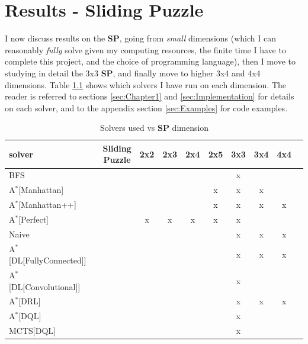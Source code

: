 \chapter{Results - Sliding Puzzle} %

\label{sec:ResultsSP} %


I now discuss results on the \textbf{SP}, going from \textit{small} dimensions (which I can reasonably \textit{fully} solve given my computing resources, the finite time I have to complete this project, and the choice of programming language), then I move to studying in detail the 3x3 \textbf{SP}, and finally move to higher 3x4 and 4x4 dimensions. Table \ref{tab:gridSP} shows which solvers I have run on each dimension. The reader is referred to sections \ref{sec:Chapter1} and \ref{sec:Implementation} for details on each solver, and to the appendix section \ref{sec:Examples} for code examples.

\begin{table}[H]
\begin{center}
\begin{tabular}{l*{9}{c}r}
\hline
\textbf{solver}      & & \textbf{Sliding Puzzle} & \textbf{2x2} & \textbf{2x3} & \textbf{2x4} & \textbf{2x5}  & \textbf{3x3} & \textbf{3x4} & \textbf{4x4} \\ 
\hline
BFS   & & & & & & &  x  & & \\
\hline
A$^{*}$[Manhattan]   & & & & & &  x  &  x  &  x  & \\
\hline
A$^{*}$[Manhattan++]   & & & & & &  x  &  x  &  x  & x \\
\hline
A$^{*}$[Perfect]   & & &  x  &  x  &  x  &  x  &  x  & & \\
\hline
Naive   & & & & & & &  x  &  x  & x \\
\hline
A$^{*}$[DL[FullyConnected]]   & & & & & & &  x  &  x  & x \\
\hline
A$^{*}$[DL[Convolutional]]   & & & & & & &  x  &  & \\
\hline
A$^{*}$[DRL]   & & & & & & &  x  &  x  & x \\
\hline
A$^{*}$[DQL]   & & & & & & &  x  & & \\
\hline
MCTS[DQL]        & & & & & & &  x  & & \\
\end{tabular}
\caption{\label{tab:gridSP} Solvers used vs \textbf{SP} dimension}
\end{center}
\end{table}

